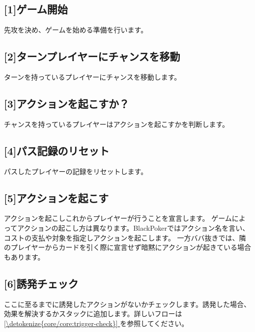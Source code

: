 \documentclass[letterpaper,10pt,dvipdfmx]{sphinxmanual}
\begin{document}
\subsection{{[}1{]}ゲーム開始}
\label{\detokenize{core/core:gamestart}}\label{\detokenize{core/core:id14}}
\sphinxAtStartPar
先攻を決め、ゲームを始める準備を行います。


\subsection{{[}2{]}ターンプレイヤーにチャンスを移動}
\label{\detokenize{core/core:id15}}
\sphinxAtStartPar
ターンを持っているプレイヤーにチャンスを移動します。


\subsection{{[}3{]}アクションを起こすか？}
\label{\detokenize{core/core:id16}}
\sphinxAtStartPar
チャンスを持っているプレイヤーはアクションを起こすかを判断します。


\subsection{{[}4{]}パス記録のリセット}
\label{\detokenize{core/core:id17}}
\sphinxAtStartPar
パスしたプレイヤーの記録をリセットします。


\subsection{{[}5{]}アクションを起こす}
\label{\detokenize{core/core:id18}}
\sphinxAtStartPar
アクションを起こしこれからプレイヤーが行うことを宣言します。
ゲームによってアクションの起こし方は異なります。BlackPokerではアクション名を言い、コストの支払や対象を指定しアクションを起こします。
一方ババ抜きでは、隣のプレイヤーからカードを引く際に宣言せず暗黙にアクションが起きている場合もあります。


\subsection{{[}6{]}誘発チェック}
\label{\detokenize{core/core:id19}}
\sphinxAtStartPar
ここに至るまでに誘発したアクションがないかチェックします。誘発した場合、効果を解決するかスタックに追加します。詳しいフローは \hyperref[\detokenize{core/core:trigger-check}]{\ref{\detokenize{core/core:trigger-check}} } を参照してください。
\end{document}
